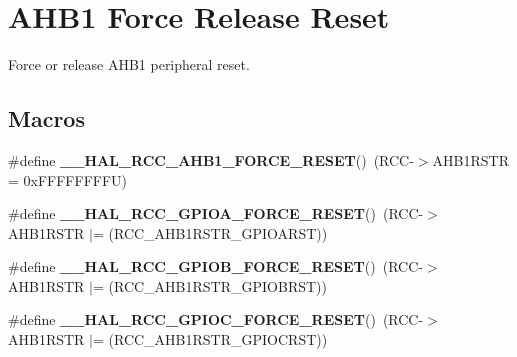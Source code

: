 \hypertarget{group___r_c_c___a_h_b1___force___release___reset}{}\section{A\+H\+B1 Force Release Reset}
\label{group___r_c_c___a_h_b1___force___release___reset}


Force or release A\+H\+B1 peripheral reset.  


\subsection*{Macros}
\begin{DoxyCompactItemize}
\item 
\mbox{\label{group___r_c_c___a_h_b1___force___release___reset_ga87d828d91e67aaa931853a60779826c2}} 
\#define {\bfseries \+\_\+\+\_\+\+H\+A\+L\+\_\+\+R\+C\+C\+\_\+\+A\+H\+B1\+\_\+\+F\+O\+R\+C\+E\+\_\+\+R\+E\+S\+ET}()~(R\+CC-\/$>$A\+H\+B1\+R\+S\+TR = 0x\+F\+F\+F\+F\+F\+F\+F\+F\+U)
\item 
\mbox{\label{group___r_c_c___a_h_b1___force___release___reset_gab329bd497cccffd979bcca9fd42bbc79}} 
\#define {\bfseries \+\_\+\+\_\+\+H\+A\+L\+\_\+\+R\+C\+C\+\_\+\+G\+P\+I\+O\+A\+\_\+\+F\+O\+R\+C\+E\+\_\+\+R\+E\+S\+ET}()~(R\+CC-\/$>$A\+H\+B1\+R\+S\+TR $\vert$= (R\+C\+C\+\_\+\+A\+H\+B1\+R\+S\+T\+R\+\_\+\+G\+P\+I\+O\+A\+R\+ST))
\item 
\mbox{\label{group___r_c_c___a_h_b1___force___release___reset_ga3b89be9638638ffce3ebd4f08a3b64cf}} 
\#define {\bfseries \+\_\+\+\_\+\+H\+A\+L\+\_\+\+R\+C\+C\+\_\+\+G\+P\+I\+O\+B\+\_\+\+F\+O\+R\+C\+E\+\_\+\+R\+E\+S\+ET}()~(R\+CC-\/$>$A\+H\+B1\+R\+S\+TR $\vert$= (R\+C\+C\+\_\+\+A\+H\+B1\+R\+S\+T\+R\+\_\+\+G\+P\+I\+O\+B\+R\+ST))
\item 
\mbox{\label{group___r_c_c___a_h_b1___force___release___reset_ga6e6a20fa8e0d7b3ebfdce26f6b1a1ed0}} 
\#define {\bfseries \+\_\+\+\_\+\+H\+A\+L\+\_\+\+R\+C\+C\+\_\+\+G\+P\+I\+O\+C\+\_\+\+F\+O\+R\+C\+E\+\_\+\+R\+E\+S\+ET}()~(R\+CC-\/$>$A\+H\+B1\+R\+S\+TR $\vert$= (R\+C\+C\+\_\+\+A\+H\+B1\+R\+S\+T\+R\+\_\+\+G\+P\+I\+O\+C\+R\+ST))

\end{DoxyCompactItemize}
